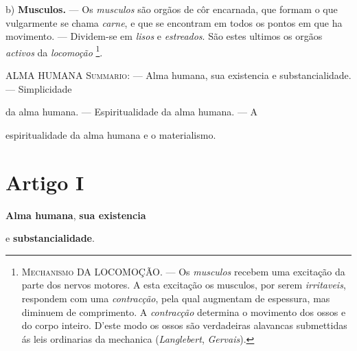 b) \textbf{Musculos.} --- Os \emph{musculos} são orgãos de côr encarnada, que formam o que vulgarmente se chama \emph{carne}, e que se encontram em todos os pontos em que ha movimento. --- Dividem-se em \emph{lisos} e \emph{estreados}. São estes ultimos os orgãos \emph{activos} da \emph{locomoção} \footnote{\textsc{Mechanismo} DA \textsc{LOCOMOÇÃO}. --- Os \emph{musculos} recebem uma excitação da parte dos nervos motores. A esta excitação os musculos, por serem \emph{irritaveis}, respondem com uma \emph{contracção}, pela qual augmentam de espessura, mas diminuem de comprimento. A \emph{contracção} determina o movimento dos ossos e do corpo inteiro. D'este modo os ossos são verdadeiras alavancas submettidas ás leis ordinarias da mechanica (\emph{Langlebert}, \emph{Gervais}).}.

ALMA HUMANA \textsc{Summario}: --- Alma humana, sua existencia e substancialidade. --- Simplicidade

da alma humana. --- Espiritualidade da alma humana. --- A

espiritualidade da alma humana e o materialismo.


\section*{Artigo I}

 \textbf{Alma humana}, \textbf{sua existencia}

e \textbf{substancialidade}.


